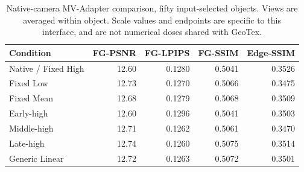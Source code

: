 \documentclass[times,twocolumn,final]{elsarticle}
\providecommand{\DIFaddbegin}{} %
\providecommand{\DIFaddend}{} %
\providecommand{\DIFdelbegin}{} %
\providecommand{\DIFdelend}{} %
\begin{document}
\DIFdelbegin %
\DIFdelend \DIFaddbegin \begin{table}[ht]\centering\scriptsize
\caption{Native-camera MV-Adapter comparison, fifty input-selected objects. Views are averaged within object. Scale values and endpoints are specific to this interface, and are not numerical doses shared with GeoTex.}\label{tab:new-mva}
\begin{tabular}{lrrrr}
\toprule Condition & FG-PSNR & FG-LPIPS & FG-SSIM & Edge-SSIM \\
\midrule
Native / Fixed High & 12.60 & 0.1280 & 0.5041 & 0.3526 \\
Fixed Low & 12.73 & 0.1270 & 0.5066 & 0.3475 \\
Fixed Mean & 12.68 & 0.1279 & 0.5068 & 0.3509 \\
Early-high & 12.60 & 0.1296 & 0.5041 & 0.3503 \\
Middle-high & 12.71 & 0.1262 & 0.5061 & 0.3470 \\
Late-high & 12.74 & 0.1260 & 0.5075 & 0.3514 \\
Generic Linear & 12.72 & 0.1263 & 0.5072 & 0.3501 \\
\bottomrule\end{tabular}\end{table}
\DIFaddend 
\end{document}
